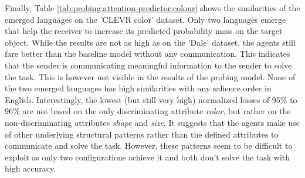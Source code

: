 Finally, Table \ref{tab:probing:attention-predictor:colour} shows the similarities of the emerged languages on the 'CLEVR color' dataset.
Only two languages emerge that help the receiver to increase its predicted probability mass on the target object.
While the results are not as high as on the 'Dale' dataset, the agents still fare better than the baseline model without any communication.
This indicates that the sender is communicating meaningful information to the sender to solve the task.
This is however not visible in the results of the probing model.
None of the two emerged languages has high similarities with any salience order in English.
Interestingly, the lowest (but still very high) normalized losses of 95\% to 96\% are not based on the only discriminating attribute \emph{color}, but rather on the non-discriminating attributes \emph{shape} and \emph{size}.
It suggests that the agents make use of other underlying structural patterns rather than the defined attributes to communicate and solve the task.
However, these patterns seem to be difficult to exploit as only two configurations achieve it and both don't solve the task with high accuracy.